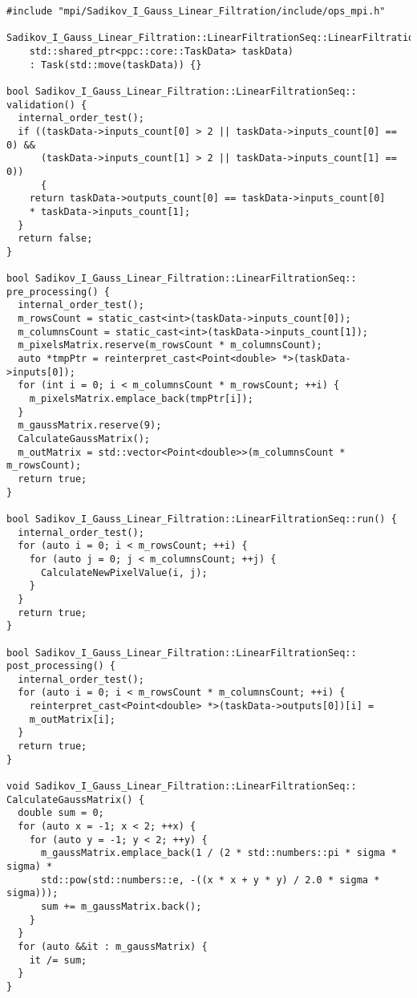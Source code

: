 \documentclass[a4paper,14pt]{report}
\begin{document}
\newpage
\begin{verbatim}
#include "mpi/Sadikov_I_Gauss_Linear_Filtration/include/ops_mpi.h"

Sadikov_I_Gauss_Linear_Filtration::LinearFiltrationSeq::LinearFiltrationSeq(
    std::shared_ptr<ppc::core::TaskData> taskData)
    : Task(std::move(taskData)) {}

bool Sadikov_I_Gauss_Linear_Filtration::LinearFiltrationSeq::
validation() {
  internal_order_test();
  if ((taskData->inputs_count[0] > 2 || taskData->inputs_count[0] == 0) &&
      (taskData->inputs_count[1] > 2 || taskData->inputs_count[1] == 0)) 
      {
    return taskData->outputs_count[0] == taskData->inputs_count[0]
    * taskData->inputs_count[1];
  }
  return false;
}

bool Sadikov_I_Gauss_Linear_Filtration::LinearFiltrationSeq::
pre_processing() {
  internal_order_test();
  m_rowsCount = static_cast<int>(taskData->inputs_count[0]);
  m_columnsCount = static_cast<int>(taskData->inputs_count[1]);
  m_pixelsMatrix.reserve(m_rowsCount * m_columnsCount);
  auto *tmpPtr = reinterpret_cast<Point<double> *>(taskData->inputs[0]);
  for (int i = 0; i < m_columnsCount * m_rowsCount; ++i) {
    m_pixelsMatrix.emplace_back(tmpPtr[i]);
  }
  m_gaussMatrix.reserve(9);
  CalculateGaussMatrix();
  m_outMatrix = std::vector<Point<double>>(m_columnsCount * m_rowsCount);
  return true;
}

bool Sadikov_I_Gauss_Linear_Filtration::LinearFiltrationSeq::run() {
  internal_order_test();
  for (auto i = 0; i < m_rowsCount; ++i) {
    for (auto j = 0; j < m_columnsCount; ++j) {
      CalculateNewPixelValue(i, j);
    }
  }
  return true;
}

bool Sadikov_I_Gauss_Linear_Filtration::LinearFiltrationSeq::
post_processing() {
  internal_order_test();
  for (auto i = 0; i < m_rowsCount * m_columnsCount; ++i) {
    reinterpret_cast<Point<double> *>(taskData->outputs[0])[i] =
    m_outMatrix[i];
  }
  return true;
}

void Sadikov_I_Gauss_Linear_Filtration::LinearFiltrationSeq::
CalculateGaussMatrix() {
  double sum = 0;
  for (auto x = -1; x < 2; ++x) {
    for (auto y = -1; y < 2; ++y) {
      m_gaussMatrix.emplace_back(1 / (2 * std::numbers::pi * sigma * sigma) *
      std::pow(std::numbers::e, -((x * x + y * y) / 2.0 * sigma * sigma)));
      sum += m_gaussMatrix.back();
    }
  }
  for (auto &&it : m_gaussMatrix) {
    it /= sum;
  }
}


\end{verbatim}
\end{document}
